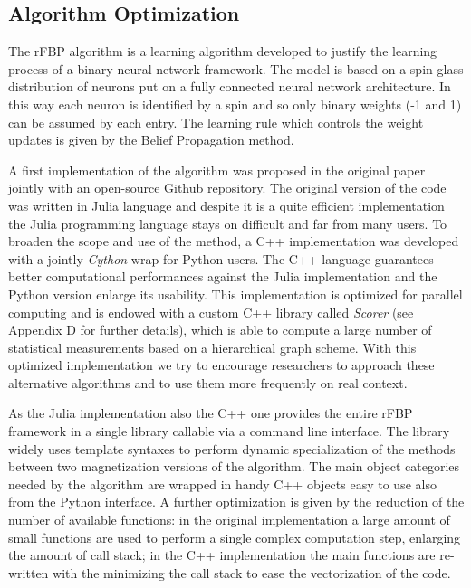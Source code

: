 \documentclass{standalone}
\begin{document}
\subsection[Algorithm Optimization]{Algorithm Optimization}\label{rfbp:rFBP}

The rFBP algorithm is a learning algorithm developed to justify the learning process of a binary neural network framework.
The model is based on a spin-glass distribution of neurons put on a fully connected neural network architecture.
In this way each neuron is identified by a spin and so only binary weights (-1 and 1) can be assumed by each entry.
The learning rule which controls the weight updates is given by the Belief Propagation method.

A first implementation of the algorithm was proposed in the original paper~\cite{BaldassiE7655} jointly with an open-source Github repository.
The original version of the code was written in Julia language and despite it is a quite efficient implementation the Julia programming language stays on difficult and far from many users.
To broaden the scope and use of the method, a C++ implementation was developed with a jointly \emph{Cython} wrap for Python users.
The C++ language guarantees better computational performances against the Julia implementation and the Python version enlarge its usability.
This implementation is optimized for parallel computing and is endowed with a custom C++ library called \emph{Scorer} (see Appendix D for further details), which is able to compute a large number of statistical measurements based on a hierarchical graph scheme.
With this optimized implementation we try to encourage researchers to approach these alternative algorithms and to use them more frequently on real context.

As the Julia implementation also the C++ one provides the entire rFBP framework in a single library callable via a command line interface.
The library widely uses template syntaxes to perform dynamic specialization of the methods between two magnetization versions of the algorithm.
The main object categories needed by the algorithm are wrapped in handy C++ objects easy to use also from the Python interface.
A further optimization is given by the reduction of the number of available functions: in the original implementation a large amount of small functions are used to perform a single complex computation step, enlarging the amount of call stack; in the C++ implementation the main functions are re-written with the minimizing the call stack to ease the vectorization of the code.
\end{document}
